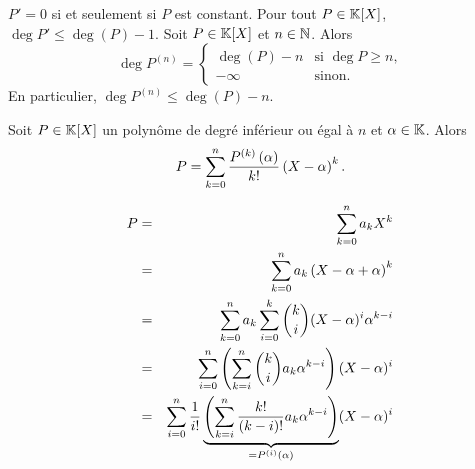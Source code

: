 \documentclass{magnolia}
\begin{document}
\begin{remarques}
\remarque $P'=0$ si et seulement si $P$ est constant.
\remarque Pour tout $P\in\polyK$, $\deg P'\leq\deg(P)-1$.
\remarque Soit $P\in\polyK$ et $n\in\mathbb{N}$. Alors 
\[\deg P^{(n)}=
  \begin{cases}
  \deg(P)-n & \text{si $\deg P\geq n$,}\\
  -\infty & \text{sinon.}
  \end{cases}\]
  En particulier, $\deg P^{(n)}\leq\deg(P)-n$.
\end{remarques}

\begin{proposition}[nom={\nom{Formule de Taylor}}]
Soit $P\in\polyK$ un polynôme de degré inférieur ou égal à $n$ et $\alpha\in\mathbb{K}$. Alors
\[P=\sum_{k=0}^n \frac{P^{(k)}\left(\alpha\right)}{k!}\left(X-\alpha\right)^k.\]  
\end{proposition}


\begin{preuve}
\begin{eqnarray*}
P&=&\sum_{k=0}^n a_kX^k\\
&=& \sum_{k=0}^n a_k\left(X-\alpha+\alpha\right)^k\\
&=&\sum_{k=0}^n a_k\sum_{i=0}^k\binom{k}{i}(X-\alpha)^i\alpha^{k-i}\\
&=&\sum_{i=0}^n\left(\sum_{k=i}^n \binom{k}{i}a_k\alpha^{k-i}\right)(X-\alpha)^i\\
&=&\sum_{i=0}^n\frac{1}{i!}\underbrace{\left(\sum_{k=i}^n \frac{k!}{(k-i)!}a_k\alpha^{k-i}\right)}_{=P^{(i)}(\alpha)}(X-\alpha)^i
\end{eqnarray*}
\end{preuve}

\end{document}
